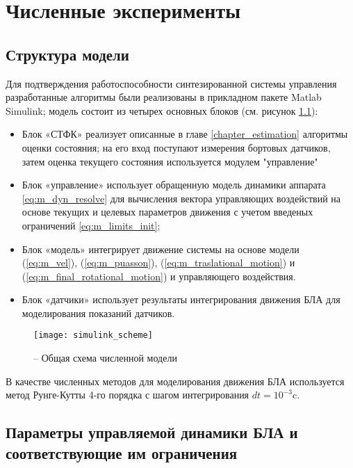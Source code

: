 
\chapter{Численные эксперименты}

\section{Структура модели}

Для подтверждения работоспособности синтезированной системы управления разработанные алгоритмы были реализованы в прикладном пакете Matlab Simulink; модель состоит из четырех основных блоков (см. рисунок \ref{fig:simulink_scheme}):
\begin{itemize}
	\item Блок «СТФК» реализует описанные в главе \ref{chapter_estimation} алгоритмы оценки состояния; на его вход поступают измерения бортовых датчиков, затем оценка текущего состояния используется модулем "управление"
	\item Блок «управление» использует обращенную модель динамики аппарата \ref{eq:m_dyn_resolve} для вычисления вектора управляющих воздействий на основе текущих и целевых параметров движения с учетом введеных ограничений \ref{eq:m_limits_init};
	\item Блок «модель» интегрирует движение системы на основе модели
	(\ref{eq:m_vel}), (\ref{eq:m_puasson}), (\ref{eq:m_traslational_motion}) и (\ref{eq:m_final_rotational_motion})
	и управляющего воздействия.
	\item Блок «датчики» использует результаты интегрирования движения БЛА для моделирования показаний датчиков.
\end{itemize}
\begin{figure}[h!]
	\centering
	\texttt{[image: simulink\_scheme]}
	\caption{ -- Общая схема численной модели}
	\label{fig:simulink_scheme}
\end{figure}
В качестве численных методов для моделирования движения БЛА используется метод Рунге-Кутты 4-го порядка с шагом интегрирования $dt={10^{-3}}$c.

\section{Параметры управляемой динамики БЛА и соответствующие им ограничения}

